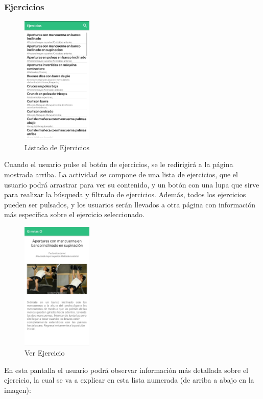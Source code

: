 \documentclass[11pt,a4paper]{report}
\begin{document}
\subsubsection{Ejercicios}
\begin{figure}[H]
	\centering
	\includegraphics[width=0.3\textwidth]{graficos/manual/ListaEjercicios.jpg}
	\caption{Listado de Ejercicios}
\end{figure}
Cuando el usuario pulse el botón de ejercicios, se le redirigirá a la página mostrada arriba. La actividad se compone de una lista de ejercicios, que el usuario podrá arrastrar para ver su contenido, y un botón con una lupa que sirve para realizar la búsqueda y filtrado de ejercicios. Además, todos los ejercicios pueden ser pulsados, y los usuarios serán llevados a otra página con información más específica sobre el ejercicio seleccionado.
\begin{figure}[H]
	\centering
	\includegraphics[width=0.3\textwidth]{graficos/manual/verEjercicio.jpg}
	\caption{Ver Ejercicio}
\end{figure}
En esta pantalla el usuario podrá observar información más detallada sobre el ejercicio, la cual se va a explicar en esta lista numerada (de arriba a abajo en la imagen):
\end{document}

